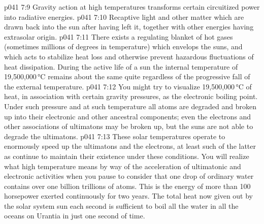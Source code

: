 \vs p041 7:9 \bibnobreakspace Gravity action at high temperatures transforms certain circuitized power into radiative energies.
\vs p041 7:10 \bibnobreakspace Recaptive light and other matter which are drawn back into the sun after having left it, together with other energies having extrasolar origin.
\vs p041 7:11 \pc There exists a regulating blanket of hot gases (sometimes millions of degrees in temperature) which envelops the suns, and which acts to stabilize heat loss and otherwise prevent hazardous fluctuations of heat dissipation. During the active life of a sun the internal temperature of 19,500,000\,°C remains about the same quite regardless of the progressive fall of the external temperature.
\vs p041 7:12 \pc You might try to visualize 19,500,000\,°C of heat, in association with certain gravity pressures, as the electronic boiling point. Under such pressure and at such temperature all atoms are degraded and broken up into their electronic and other ancestral components; even the electrons and other associations of ultimatons may be broken up, but the suns are not able to degrade the ultimatons.
\vs p041 7:13 These solar temperatures operate to enormously speed up the ultimatons and the electrons, at least such of the latter as continue to maintain their existence under these conditions. You will realize what high temperature means by way of the acceleration of ultimatonic and electronic activities when you pause to consider that one drop of ordinary water contains over one billion trillions of atoms. This is the energy of more than 100 horsepower exerted continuously for two years. The total heat now given out by the solar system sun each second is sufficient to boil all the water in all the oceans on Urantia in just one second of time.
